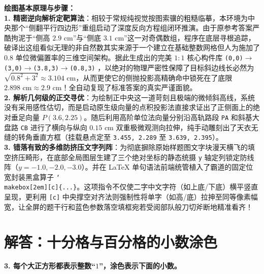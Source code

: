 \documentclass[12pt, a4paper]{ctexrep}
\begin{document}
{\small\color{blue!70!black}
\textbf{绘图基本原理与步骤：}\\
\textbf{1. 精密逆向解析定靶算法}：相较于常规纯视觉按图索骥的粗糙临摹，本环境为中央那个“侧翻平行四边形”重组启动了深度反向方程组闭环推演。由于原参考答案严酷拘泥于“侧高 $2.9\text{ cm}$”与“侧底 $3.1\text{ cm}$”这一对奇偶数组，程序在底层寻根追踪，破译出这组看似无理的非自然数其实来源于一个建立在基础整数网格但人为施加了 $0.8$ 单位微偏置率的三维空间架构。据此生成出的完美 $1:1$ 核心构件库 \texttt{(0,0)$\to$(3,0)$\to$(3.8,3)$\to$(0.8,3)} ，以绝对的物理严密性保障了目标斜边线长必然为 $\sqrt{0.8^2 + 3^2} \approx 3.104 \text{ cm}$，从而更使它的侧抛投影高精确命中锁死在了底限 $2.898 \text{ cm} \approx 2.9 \text{ cm}$！全自动复现了标准答案的真实严谨面貌。\\
\textbf{2. 解析几何级的正交寻优}：为绘制正中央这一道苛刻且极端的微倾斜高线，系统没有采用感性估切，而是启动原生级向量的点积投影法直接求证出了正侧面上的绝对垂足向量 $P(3.6, 2.25)$。随后利用高阶单位法向量分别沿高轨路段 \texttt{PA} 和斜基大盘路 \texttt{CB} 进行了横向与纵向 $0.15\text{ cm}$ 双重极微观测向拉伸，纯手动雕刻出了天衣无缝的转角垂直方框（挂载悬点定至 \texttt{3.455, 2.289} 至 \texttt{3.639, 2.395}）。\\
\textbf{3. 错落有致的多维防挤压文字列阵}：为彻底摒除原始样题图文字块漫天横飞的填空挤压畸形，在底部全局图层生建了三个绝对坐标的静态统摄 \texttt{y} 轴定列锁定防线阵（$y={-}1.0, {-}2.0, {-}3.0$）。并在 LaTeX 单句语法前端统管植入了霸道的固定位宽封装黑盒算子 \texttt{\char`\\makebox[2em][c]\{...\}}。这项指令不仅使二字中文字符（如上底/下底）横平竖直呈现，更利用 \texttt{[c]} 中央撑空对齐法则强制性将单字（如高/底）拉抻至同等像素幅宽，让全屏的题干行和蓝色参数落空填框宛若受阅部队般刀切斧断地精准看齐！
}


\newpage

\section{解答：十分格与百分格的小数涂色}

\vspace{0.4cm}

\noindent\textbf{3. 每个大正方形都表示整数“$1$”，涂色表示下面的小数。}

\vspace{0.8cm}
\end{document}
